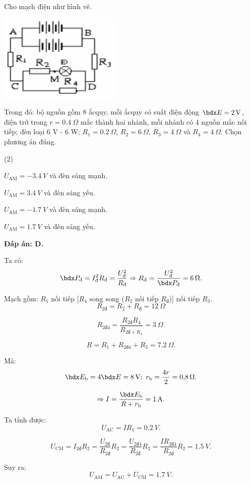 \begin{enumerate}[label=\bfseries Câu \arabic*:]
	\cauhoi
	{Cho mạch điện như hình vẽ.
		\begin{center}
			\includegraphics{../figs/VN11-2021-PH-TP016-8.png}
		\end{center}
	Trong đó: bộ nguồn gồm 8 ắcquy, mỗi ắcquy có suất điện động $\calE=\SI{2}{V}$, điện trở trong $r=\SI{0.4}{\Omega}$ mắc thành hai nhánh, mỗi nhánh có 4 nguồn mắc nối tiếp; đèn loại 6 V - 6 W; $R_1=\SI{0.2}{\Omega}$, $R_2=\SI{6}{\Omega}$, $R_3=\SI{4}{\Omega}$ và $R_4=\SI{4}{\Omega}$. Chọn phương án đúng.
		
	}
	\loigiai
	{	\textbf{Đáp án: D.}
		
		Ta có:
		$$\calP_\text{đ} = I_\text{đ}^2 R_\text{đ} = \dfrac{U_\text{đ}^2}{R_\text{đ}} \Rightarrow R_\text{đ} = \dfrac{U_\text{đ}^2}{\calP_\text{đ}} = \SI{6}{\Omega}.$$
		
		Mạch gồm: $R_1$ nối tiếp [$R_4$ song song ($R_2$ nối tiếp $R_\text{đ}$)] nối tiếp $R_3$.
		$$R_\text{2đ} = R_2 + R_\text{đ} = \SI{12}{\Omega}$$
		
		$$R_\text{2đ4} = \dfrac{R_\text{2đ} R_4}{R_{\text{2đ} + R_4}} = \SI{3}{\Omega}.$$
		
		$$R=R_1 + R_\text{2đ4} + R_3 = \SI{7.2}{\Omega}.$$
		
		Mà:
		$$\calE_\text{b} = 4 \calE = \SI{8}{V};\ r_\text{b} = \dfrac{4r}{2} = \SI{0.8}{\Omega}.$$
		
		$$\Rightarrow I = \dfrac{\calE_\text{b}}{R+r_\text{b}} = \SI{1}{A}.$$
		
		Ta tính được:
		$$U_\text{AC} = I R_1 = \SI{0.2}{V}.$$
		
		$$U_\text{CM} = I_\text{2đ} R_2 = \dfrac{U_\text{2đ}}{R_\text{2đ}} R_2 = \dfrac{U_\text{2đ4}}{R_\text{2đ}} R_2 = \dfrac{I R_\text{2đ4}}{R_\text{2đ}} R_2 = \SI{1.5}{V}.$$
		
		Suy ra:
		$$U_\text{AM} = U_\text{AC} + U_\text{CM} = \SI{1.7}{V}.$$
	}
\end{enumerate}

